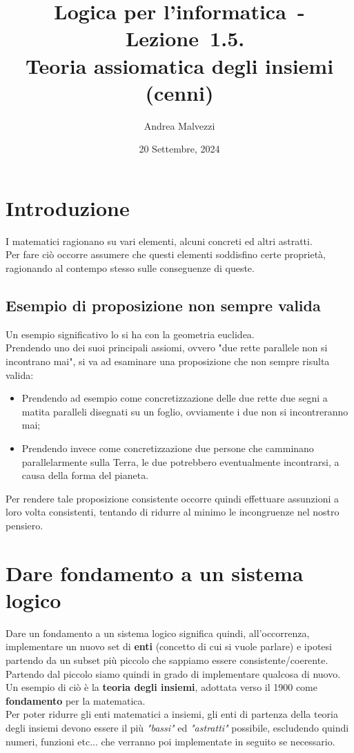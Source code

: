 \documentclass[12pt]{article}
\author{Andrea Malvezzi}
\title{\textbf{Logica per l'informatica~-~Lezione~1.5.\\Teoria assiomatica degli insiemi (cenni)}}
\date{20 Settembre, 2024}
\begin{document}
\maketitle
\pagebreak
\section{Introduzione}
I matematici ragionano su vari elementi, alcuni concreti ed altri astratti.\\
Per fare ciò occorre assumere che questi elementi soddisfino certe proprietà, ragionando al contempo stesso sulle conseguenze di queste.
\subsection{Esempio di proposizione non sempre valida}
Un esempio significativo lo si ha con la geometria euclidea.\\
Prendendo uno dei suoi principali assiomi, ovvero "due rette parallele non si incontrano mai", si va ad esaminare una proposizione che non sempre risulta valida:
\begin{itemize}
    \item Prendendo ad esempio come concretizzazione delle due rette due segni a matita paralleli disegnati su un foglio, ovviamente i due non si incontreranno mai;
    \item Prendendo invece come concretizzazione due persone che camminano parallelarmente sulla Terra, le due potrebbero eventualmente incontrarsi, a causa della forma del pianeta.
\end{itemize}
Per rendere tale proposizione consistente occorre quindi effettuare assunzioni a loro volta consistenti, tentando di ridurre al minimo le incongruenze nel nostro pensiero.
\pagebreak
\section{Dare fondamento a un sistema logico}
Dare un fondamento a un sistema logico significa quindi, all'occorrenza, implementare un nuovo set di \textbf{enti} (concetto di cui si vuole parlare) e ipotesi partendo da un subset più piccolo che sappiamo essere consistente/coerente.\\
Partendo dal piccolo siamo quindi in grado di implementare qualcosa di nuovo.\\
Un esempio di ciò è la \textbf{teoria degli insiemi}, adottata verso il 1900 come \textbf{fondamento} per la matematica.\\
Per poter ridurre gli enti matematici a insiemi, gli enti di partenza della teoria degli insiemi devono essere il più \textit{"bassi"} ed \textit{"astratti"} possibile, escludendo quindi numeri, funzioni etc... che verranno poi implementate in seguito se necessario.
\end{document}
